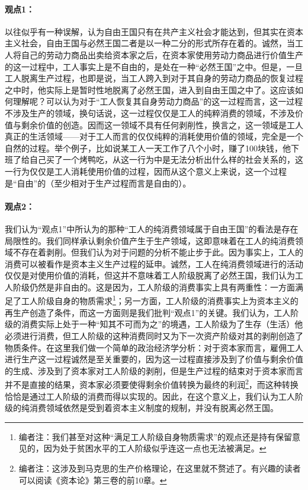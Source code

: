 \documentclass[a4paper,twoside,12pt,AutoFakeBold]{ctexart}
\begin{document}
\paragraph{观点1：}\begin{fangsong}
以往似乎有一种误解，认为自由王国只有在共产主义社会才能达到，但其实在资本主义社会，自由王国与必然王国二者是以一种二分的形式所存在着的。诚然，当工人将自己的劳动力商品出卖给资本家之后，在资本家使用劳动力商品进行价值生产的这一过程中，工人事实上是不自由的，是处在一种“必然王国”之中。但是，一旦工人脱离生产过程，也即是说，当工人跨入到对于其自身的劳动力商品的恢复过程之中时，他实际上是暂时性地脱离了必然王国，进入到自由王国之中了。这应该如何理解呢？可以认为对于“工人恢复其自身劳动力商品”的这一过程而言，这一过程不涉及生产的领域，换句话说，这一过程仅仅是工人的纯粹消费的领域，不涉及价值与剩余价值的创造。因而这一领域不具有任何剥削性，换言之，这一领域是工人真正的生活领域——对于工人而言的仅仅纯粹的消耗使用价值的领域，完全是一个自然的过程。举个例子，比如说某工人一天工作了八个小时，赚了100块钱，他下班了给自己买了一个烤鸭吃，从这一行为中是无法分析出什么样的社会关系的，这一行为仅仅是工人消耗使用价值的过程，因而从这个意义上来说，这一个过程是“自由”的（至少相对于生产过程而言是自由的）。
\end{fangsong}
\paragraph{观点2：}\begin{fangsong}
我们认为“观点1”中所认为的那种“工人的纯消费领域属于自由王国”的看法是存在局限性的。我们同样承认剩余价值产生于生产领域，这即意味着在工人的纯消费领域不存在着剥削。但我们认为对于问题的分析不能止步于此。因为事实上，工人的消费可以被看作是资本主义生产过程的延申。诚然，工人在纯消费领域进行的活动仅仅是对使用价值的消耗，但这并不意味着工人阶级脱离了必然王国，我们认为工人阶级仍然是非自由的。这是因为，工人阶级的消费事实上具有两重性：一方面满足了工人阶级自身的物质需求\footnote{编者注：我们甚至对这种“满足工人阶级自身物质需求”的观点还是持有保留意见的，因为处于贫困水平的工人阶级似乎连这一点也无法被满足。}；另一方面，工人阶级的消费事实上为资本主义的再生产创造了条件，而这一方面则是我们批判“观点1”的关键。我们认为，工人阶级的消费实际上处于一种“知其不可而为之”的境遇，工人阶级为了生存（生活）他必须进行消费，但工人阶级的这种消费同时又为下一次资产阶级对其的剥削创造了物质条件。在这里我们做一个简单的政治经济学分析：对于资本家而言，雇佣工人进行生产这一过程诚然是至关重要的，因为这一过程直接涉及到了价值与剩余价值的生成、涉及到了资本家对工人阶级的剥削，但是生产过程的结束对于资本家而言并不是直接的结果，资本家必须要使得剩余价值转换为最终的利润\footnote{编者注：这涉及到马克思的生产价格理论，在这里就不赘述了。有兴趣的读者可以阅读《资本论》第三卷的前10章。}，而这种转换恰恰是通过工人阶级的消费而得以实现的。因此，在这个意义上，我们认为工人阶级的纯消费领域依然是受到着资本主义制度的规制，并没有脱离必然王国。    
\end{fangsong}
\vspace{0.5cm} %
\end{document}
